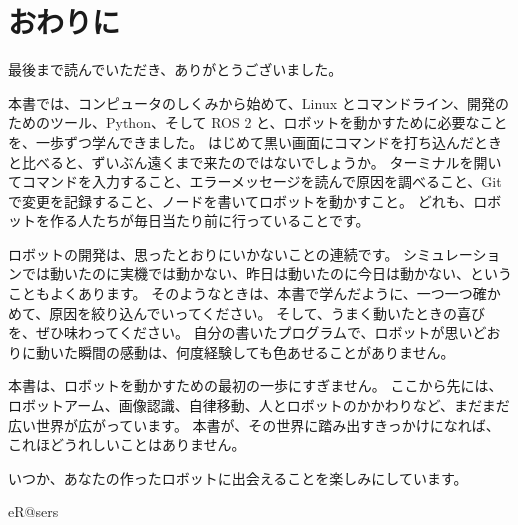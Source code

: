 \clearpage{}
\chapter*{おわりに}

最後まで読んでいただき、ありがとうございました。

本書では、コンピュータのしくみから始めて、Linux とコマンドライン、開発のためのツール、Python、そして ROS 2 と、ロボットを動かすために必要なことを、一歩ずつ学んできました。
はじめて黒い画面にコマンドを打ち込んだときと比べると、ずいぶん遠くまで来たのではないでしょうか。
ターミナルを開いてコマンドを入力すること、エラーメッセージを読んで原因を調べること、Git で変更を記録すること、ノードを書いてロボットを動かすこと。
どれも、ロボットを作る人たちが毎日当たり前に行っていることです。

ロボットの開発は、思ったとおりにいかないことの連続です。
シミュレーションでは動いたのに実機では動かない、昨日は動いたのに今日は動かない、ということもよくあります。
そのようなときは、本書で学んだように、一つ一つ確かめて、原因を絞り込んでいってください。
そして、うまく動いたときの喜びを、ぜひ味わってください。
自分の書いたプログラムで、ロボットが思いどおりに動いた瞬間の感動は、何度経験しても色あせることがありません。

本書は、ロボットを動かすための最初の一歩にすぎません。
ここから先には、ロボットアーム、画像認識、自律移動、人とロボットのかかわりなど、まだまだ広い世界が広がっています。
本書が、その世界に踏み出すきっかけになれば、これほどうれしいことはありません。

いつか、あなたの作ったロボットに出会えることを楽しみにしています。

\bigskip
\begin{flushright}
  eR@sers
\end{flushright}

